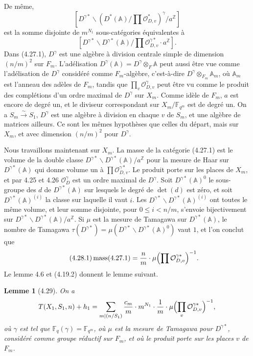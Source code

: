 \documentclass[10pt]{article}
\newcommand{\Fq}{\mathbb F_q}
\newcommand{\Fqm}{\mathbb F_{q^m}}
\newcommand{\Z}{\mathbb Z}
\newcommand{\Adele}{\mathbb A}
\newcommand{\mass}{\operatorname{mass}}
\newcommand{\OD}{\mathcal O_D}
\theoremstyle{deligne}
\newtheorem*{lemma*}{Lemme}
\newcommand{\heading}[1]{\vspace{0.7em}\noindent{\bfseries #1}\quad}
\begin{document}
De même,
\[
[D^{\gamma *}\backslash(D^*(\Adele)/\prod\mathcal O_{D,v}^*)^\gamma/a^\Z]
\]
est la somme disjointe de $m^{N_1}$ sous-catégories équivalentes à
\begin{equation}\tag{4.27.1}
[D^{\gamma *}\backslash D^{\gamma *}(\Adele)/\prod\mathcal O_{D,v}^{\gamma *}\cdot a^\Z].
\end{equation}
Dans (4.27.1), $D^\gamma$ est une algèbre à division centrale simple de dimension $(n/m)^2$ sur $F_m$. L'adélisation $D^\gamma(\Adele)=D^\gamma\otimes_F\Adele$ peut aussi être vue comme l'adélisation de $D^\gamma$ considéré comme $F_m$-algèbre, c'est-à-dire $D^\gamma\otimes_{F_m}\Adele_m$, où $\Adele_m$ est l'anneau des adèles de $F_m$, tandis que $\prod_v\mathcal O_{D,v}^\gamma$ peut être vu comme le produit des complétions d'un ordre maximal de $D^\gamma$ sur $X_m$. Comme id\`ele de $F_m$, $a$ est encore de degré un, et le diviseur correspondant sur $X_m/\Fqm$ est de degré un. On a $S_m\xrightarrow{\sim}S_1$, $D^\gamma$ est une algèbre à division en chaque $v$ de $S_m$, et une algèbre de matrices ailleurs. Ce sont les mêmes hypothèses que celles du départ, mais sur $X_m$, et avec dimension $(n/m)^2$ pour $D^\gamma$.

\heading{4.28.} Nous travaillons maintenant sur $X_m$. La masse de la catégorie (4.27.1) est le volume de la double classe $D^{\gamma *}\backslash D^{\gamma *}(\Adele)/a^\Z$ pour la mesure de Haar sur $D^{\gamma *}(\Adele)$ qui donne volume un à $\prod\mathcal O_{D,v}^{\gamma *}$. Le produit porte sur les places de $X_m$, et par 4.25 et 4.26 $\OD^\gamma$ est un ordre maximal de $D^\gamma$. Soit $D^{\gamma *}(\Adele)^0$ le sous-groupe des $d$ de $D^{\gamma *}(\Adele)$ sur lesquels le degré de $\det(d)$ est zéro, et soit $D^{\gamma *}(\Adele)^{(i)}$ la classe sur laquelle il vaut $i$. Les $D^{\gamma *}\backslash D^{\gamma *}(\Adele)^{(i)}$ ont toutes le même volume, et leur somme disjointe, pour $0\le i<n/m$, s'envoie bijectivement sur $D^{\gamma *}\backslash D^{\gamma *}(\Adele)/a^\Z$. Si $\mu$ est la mesure de Tamagawa sur $D^{\gamma *}(\Adele)$, le nombre de Tamagawa $\tau(D^{\gamma *})=\mu(D^{\gamma *}\backslash D^{\gamma *}(\Adele)^0)$ vaut $1$, et l'on conclut que
\begin{equation}\tag{4.28.1}
\mass(4.27.1)=\frac{n}{m}\cdot \mu\Bigl(\prod\mathcal O_{D,v}^{\gamma *}\Bigr)^{-1}.
\end{equation}
Le lemme 4.6 et (4.19.2) donnent le lemme suivant.

\begin{lemma*}[4.29]
On a
\[
T(X_1,S_1,n)+h_1=\sum_{m\mid(n/S_1)}\frac{c_m}{m}\cdot m^{N_1}\cdot\frac1m\cdot
\mu\Bigl(\prod_v\mathcal O_{D,v}^{\gamma *}\Bigr)^{-1},
\]
où $\gamma$ est tel que $\Fq(\gamma)=\Fqm$, où $\mu$ est la mesure de Tamagawa pour $D^{\gamma *}$, considéré comme groupe réductif sur $F_m$, et où le produit porte sur les places $v$ de $F_m$.
\end{lemma*}
\end{document}
